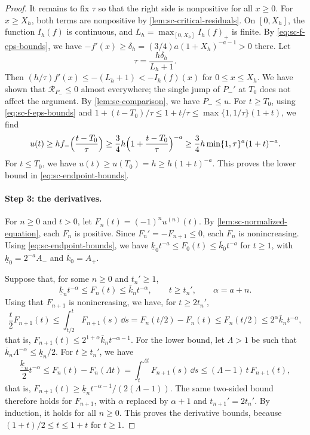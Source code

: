 \begin{proof}
It remains to fix $\tau$ so that the right side is nonpositive for all $x\ge0$. For $x\ge X_h$, both terms are nonpositive by \cref{lem:sc-critical-residuals}. On $[0,X_h]$, the function $I_h(f)$ is continuous, and $L_h=\max_{[0,X_h]}I_h(f)_+$ is finite. By \eqref{eq:sc-f-eps-bounds}, we have $-f'(x)\ge\delta_h=(3/4)a(1+X_h)^{-a-1}>0$ there. Let
\[
 \tau=\frac{h\delta_h}{L_h+1}.
\]
Then $(h/\tau)f'(x)\le-(L_h+1)<-I_h(f)(x)$ for $0\le x\le X_h$. We have shown that $\mathcal R_{P_-}\le0$ almost everywhere; the single jump of $P_-'$ at $T_0$ does not affect the argument. By \cref{lem:sc-comparison}, we have $P_-\le u$. For $t\ge T_0$, using \eqref{eq:sc-f-eps-bounds} and $1+(t-T_0)/\tau\le1+t/\tau\le\max\{1,1/\tau\}(1+t)$, we find
\[
 u(t)\ge hf_-\Bigl(\frac{t-T_0}\tau\Bigr)\ge\frac34h\Bigl(1+\frac{t-T_0}\tau\Bigr)^{-a}
 \ge\frac34h\min\{1,\tau\}^a(1+t)^{-a}.
\]
For $t\le T_0$, we have $u(t)\ge u(T_0)=h\ge h(1+t)^{-a}$. This proves the lower bound in \eqref{eq:sc-endpoint-bounds}.

\paragraph{Step 3: the derivatives.} For $n\ge0$ and $t>0$, let $F_n(t)=(-1)^nu^{(n)}(t)$. By \cref{lem:sc-normalized-equation}, each $F_n$ is positive. Since $F_n'=-F_{n+1}\le0$, each $F_n$ is nonincreasing. Using \eqref{eq:sc-endpoint-bounds}, we have $\underline k_0t^{-a}\le F_0(t)\le\overline k_0t^{-a}$ for $t\ge1$, with $\underline k_0=2^{-a}A_-$ and $\overline k_0=A_+$.

Suppose that, for some $n\ge0$ and $t_n'\ge1$,
\[
 \underline k_nt^{-\alpha}\le F_n(t)\le\overline k_nt^{-\alpha},\qquad t\ge t_n',\qquad \alpha=a+n .
\]
Using that $F_{n+1}$ is nonincreasing, we have, for $t\ge2t_n'$,
\[
 \frac t2F_{n+1}(t)\le\int_{t/2}^tF_{n+1}(s)\,\dd s=F_n(t/2)-F_n(t)\le F_n(t/2)\le2^\alpha\overline k_nt^{-\alpha},
\]
that is, $F_{n+1}(t)\le2^{1+\alpha}\overline k_nt^{-\alpha-1}$. For the lower bound, let $\Lambda>1$ be such that $\overline k_n\Lambda^{-\alpha}\le\underline k_n/2$. For $t\ge t_n'$, we have
\[
 \frac{\underline k_n}2t^{-\alpha}\le F_n(t)-F_n(\Lambda t)=\int_t^{\Lambda t}F_{n+1}(s)\,\dd s\le(\Lambda-1)\,t\,F_{n+1}(t),
\]
that is, $F_{n+1}(t)\ge\underline k_nt^{-\alpha-1}/(2(\Lambda-1))$. The same two-sided bound therefore holds for $F_{n+1}$, with $\alpha$ replaced by $\alpha+1$ and $t_{n+1}'=2t_n'$. By induction, it holds for all $n\ge0$. This proves the derivative bounds, because $(1+t)/2\le t\le1+t$ for $t\ge1$.
\end{proof}

